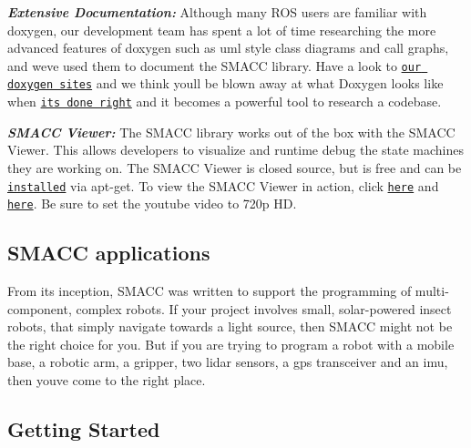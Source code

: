 \begin{DoxyItemize}
\begin{DoxyItemize}
\item {\itshape {\bfseries Extensive Documentation\+:}} Although many R\+OS users are familiar with doxygen, our development team has spent a lot of time researching the more advanced features of doxygen such as uml style class diagrams and call graphs, and we\textquotesingle{}ve used them to document the S\+M\+A\+CC library. Have a look to \href{https://reelrbtx.github.io/SMACC_Documentation/master/html/namespaces.html}{\tt our doxygen sites} and we think you\textquotesingle{}ll be blown away at what Doxygen looks like when \href{https://reelrbtx.github.io/SMACC_Documentation/master/html/classsmacc_1_1ISmaccStateMachine.html}{\tt it\textquotesingle{}s done right} and it becomes a powerful tool to research a codebase.
\item {\itshape {\bfseries S\+M\+A\+CC Viewer\+:}} The S\+M\+A\+CC library works out of the box with the S\+M\+A\+CC Viewer. This allows developers to visualize and runtime debug the state machines they are working on. The S\+M\+A\+CC Viewer is closed source, but is free and can be \href{http://smacc.dev/smacc-viewer/}{\tt installed} via apt-\/get. To view the S\+M\+A\+CC Viewer in action, click \href{https://www.youtube.com/watch?v=WVt4M_teA5I}{\tt here} and \href{https://www.youtube.com/watch?v=fdy37WvC4FQ}{\tt here}. Be sure to set the youtube video to 720p HD.
\end{DoxyItemize}
\end{DoxyItemize}

\subsection*{S\+M\+A\+CC applications}

From it\textquotesingle{}s inception, S\+M\+A\+CC was written to support the programming of multi-\/component, complex robots. If your project involves small, solar-\/powered insect robots, that simply navigate towards a light source, then S\+M\+A\+CC might not be the right choice for you. But if you are trying to program a robot with a mobile base, a robotic arm, a gripper, two lidar sensors, a gps transceiver and an imu, then you\textquotesingle{}ve come to the right place.

 

\subsection*{Getting Started}

